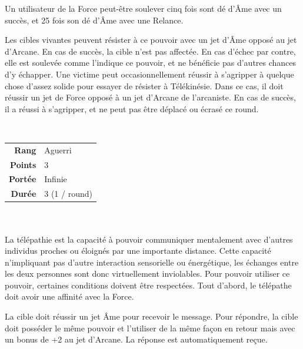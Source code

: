 \begin{description}[align=left]
        Un utilisateur de la Force peut-être soulever cinq fois sont dé d’\^Ame avec un succès, et 25 fois son dé d’\^Ame avec une Relance.

        Les cibles vivantes peuvent résister à ce pouvoir avec un jet d’\^Ame opposé au jet d’Arcane. En cas de succès, la cible n’est pas affectée. En cas d’échec par contre, elle est soulevée comme l’indique ce pouvoir, et ne bénéficie pas d’autres chances d’y échapper. Une victime peut occasionnellement réussir à s’agripper à quelque chose d’assez solide pour essayer de résister à Télékinésie. Dans ce cas, il doit réussir un jet de Force opposé à un jet d’Arcane de l’arcaniste. En cas de succès, il a réussi à s’agripper, et ne peut pas être déplacé ou écrasé ce round.
        \\

    \item [Télépathie] ~ \\

        \begin{tabular}{ r l }
            \textbf{Rang}    & Aguerri \\
            \textbf{Points}  & 3 \\
            \textbf{Portée}  & Infinie \\
            \textbf{Durée}   & 3 (1 / round) \\
        \end{tabular}
        \\ \\
        La télépathie est la capacité à pouvoir communiquer mentalement avec d'autres individus proches ou éloignés par une importante distance. Cette capacité n'impliquant pas d'autre interaction sensorielle ou énergétique, les échanges entre les deux personnes sont donc virtuellement inviolables. Pour pouvoir utiliser ce pouvoir, certaines conditions doivent être respectées. Tout d'abord, le télépathe doit avoir une affinité avec la Force. 

        La cible doit réussir un jet \^Ame pour recevoir le message. Pour répondre, la cible doit posséder le même pouvoir et l'utiliser de la même façon en retour mais avec un bonus de +2 au jet d'Arcane. La réponse est automatiquement reçue.
        \\

    \item [Vitesse de Force] ~ \\


\end{description}
